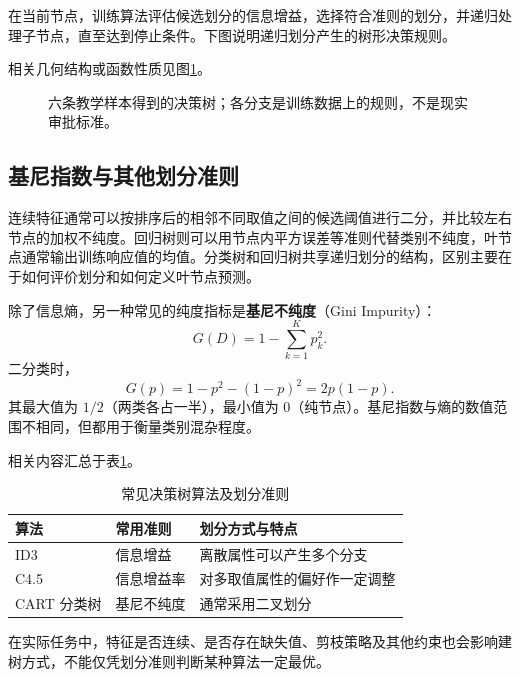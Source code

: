 在当前节点，训练算法评估候选划分的信息增益，选择符合准则的划分，并递归处理子节点，直至达到停止条件。下图说明递归划分产生的树形决策规则。

相关几何结构或函数性质见图\ref{fig:toy-decision-tree}。
\begin{figure}[htbp]\centering
{}
\caption{六条教学样本得到的决策树；各分支是训练数据上的规则，不是现实审批标准。}
\label{fig:toy-decision-tree}
\end{figure}

\subsection{基尼指数与其他划分准则}

连续特征通常可以按排序后的相邻不同取值之间的候选阈值进行二分，并比较左右节点的加权不纯度。回归树则可以用节点内平方误差等准则代替类别不纯度，叶节点通常输出训练响应值的均值。分类树和回归树共享递归划分的结构，区别主要在于如何评价划分和如何定义叶节点预测。

除了信息熵，另一种常见的纯度指标是\textbf{基尼不纯度}（Gini Impurity）：
\begin{equation}\label{eq:gini}
G(D)=1-\sum_{k=1}^{K}p_k^2.
\end{equation}
二分类时，
\[
G(p)=1-p^2-(1-p)^2=2p(1-p).
\]
其最大值为 $1/2$（两类各占一半），最小值为 $0$（纯节点）。基尼指数与熵的数值范围不相同，但都用于衡量类别混杂程度。

相关内容汇总于表\ref{tab:tree-criteria}。
\begin{table}[htbp]\centering
\caption{常见决策树算法及划分准则}\label{tab:tree-criteria}
\begin{tabularx}{\textwidth}{p{29mm}p{27mm}X}\toprule
算法&常用准则&划分方式与特点\\\midrule
ID3&信息增益&离散属性可以产生多个分支\\
C4.5&信息增益率&对多取值属性的偏好作一定调整\\
CART 分类树&基尼不纯度&通常采用二叉划分\\\bottomrule
\end{tabularx}
\end{table}
在实际任务中，特征是否连续、是否存在缺失值、剪枝策略及其他约束也会影响建树方式，不能仅凭划分准则判断某种算法一定最优。

